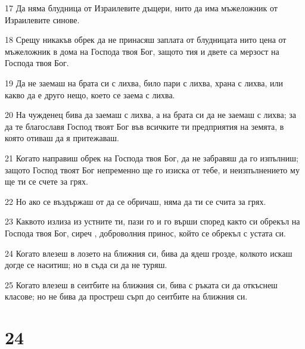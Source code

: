 \par 17 Да няма блудница от Израилевите дъщери, нито да има мъжеложник от Израилевите синове.
\par 18 Срещу никакъв обрек да не принасяш заплата от блудницата нито цена от мъжеложник в дома на Господа твоя Бог, защото тия и двете са мерзост на Господа твоя Бог.
\par 19 Да не заемаш на брата си с лихва, било пари с лихва, храна с лихва, или какво да е друго нещо, което се заема с лихва.
\par 20 На чужденец бива да заемаш с лихва, а на брата си да не заемаш с лихва; за да те благославя Господ твоят Бог във всичките ти предприятия на земята, в която отиваш да я притежаваш.
\par 21 Когато направиш обрек на Господа твоя Бог, да не забравяш да го изпълниш; защото Господ твоят Бог непременно ще го изиска от тебе, и неизпълнението му ще ти се счете за грях.
\par 22 Но ако се въздържаш от да се обричаш, няма да ти се счита за грях.
\par 23 Каквото излиза из устните ти, пази го и го върши според както си обрекъл на Господа твоя Бог, сиреч , доброволния принос, който се обрекъл с устата си.
\par 24 Когато влезеш в лозето на ближния си, бива да ядеш грозде, колкото искаш догде се наситиш; но в съда си да не туряш.
\par 25 Когато влезеш в сеитбите на ближния си, бива с ръката си да откъснеш класове; но не бива да простреш сърп до сеитбите на ближния си.

\chapter{24}

